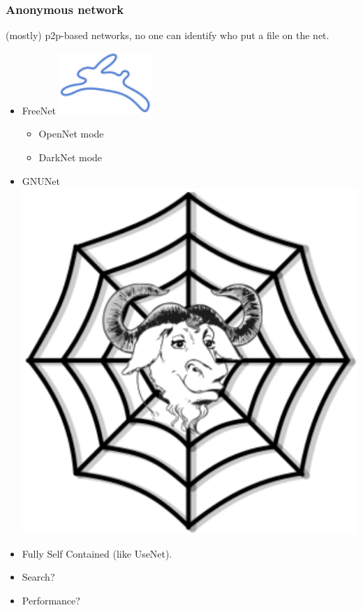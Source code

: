 \begin{frame}
	\frametitle{Anonymous network}
	(mostly) p2p-based networks, no one can identify who put a file on the
	net.
	\begin{itemize}
		\item FreeNet \includegraphics[scale=.5]{imgs/Freenet_logo}
		\begin{itemize}
			\item OpenNet mode
			\item DarkNet mode
		\end{itemize}
		\item GNUNet \includegraphics[scale=0.1]{imgs/GNUnet_logo}
	\end{itemize}

	\begin{itemize}
		\item Fully Self Contained (like UseNet).
		\item Search?
		\item Performance?
	\end{itemize}
\end{frame}

